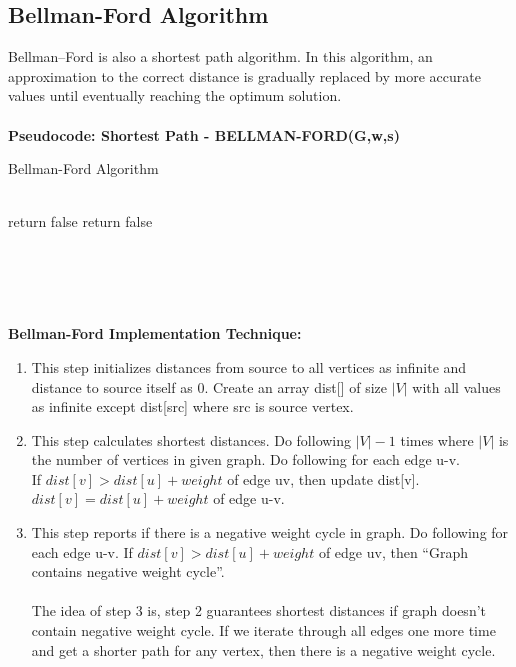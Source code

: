 \documentclass[a4paper,10pt]{article}
\begin{document}
\subsection{Bellman-Ford Algorithm}
Bellman–Ford is also a shortest path algorithm. In this algorithm, an approximation to the correct distance is gradually replaced by more accurate values until eventually reaching the optimum solution.\\\\
\textbf{Pseudocode: Shortest Path - BELLMAN-FORD(G,w,s)~\cite{re6}}
\begin{algorithm}
    \caption{Bellman-Ford Algorithm}
    \label{bel}
    \begin{algorithmic}[1]
        \\
             \EndFor
        \EndFor
         \State return false \Else \State return false \EndIf
        \EndFor
        \EndProcedure
        \\\\
        \\
    \end{algorithmic}
\end{algorithm}
\\\\
\textbf{Bellman-Ford Implementation Technique:}\\
\begin{enumerate}
  \item This step initializes distances from source to all vertices as infinite and distance to source itself as 0. Create an array dist[] of size $|V|$ with all values as infinite except dist[src] where src is source vertex.
  \item This step calculates shortest distances. Do following $|V|-1$ times where $|V|$ is the number of vertices in given graph. Do following for each edge u-v.\\
         \hfill If $dist[v] > dist[u] + weight$ of edge uv, then update dist[v].\\
             \hfill \hfill $dist[v] = dist[u] + weight$ of edge u-v.

  \item This step reports if there is a negative weight cycle in graph. Do following for each edge u-v.
If $dist[v] > dist[u] + weight$ of edge uv, then “Graph contains negative weight cycle”.\\\\
\hfill The idea of step 3 is, step 2 guarantees shortest distances if graph doesn’t contain negative weight cycle. If we iterate through all edges one more time and get a shorter path for any vertex, then there is a negative weight cycle.\\
\end{enumerate}
\end{document}

